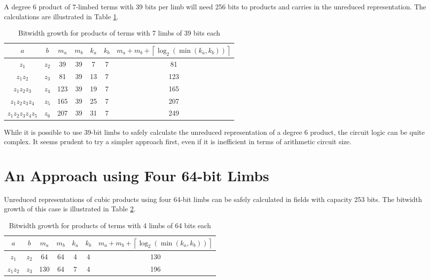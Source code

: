 \documentclass[a4paper, 12pt]{article}
\begin{document}
A degree 6 product of 7-limbed terms with 39 bits per limb will need 256 bits to products and carries in the unreduced representation. The calculations are illustrated in Table \ref{tab:limb39}.
\begin{table}[h]
  \centering
  \begin{tabular}{c|c|c|c|c|c|c}
    $a$ & $b$ & $m_a$ & $m_b$ & $k_a$ & $k_b$ & $m_a+m_b+\left\lceil \log_2 \left( \min\left( k_a, k_b \right) \right) \right\rceil$ \\ \hline
    $z_1$ & $z_2$ & 39 & 39 & 7 & 7 & 81 \\ \hline
    $z_1z_2$ & $z_3$ & 81 & 39 & 13 & 7 & 123 \\ \hline
    $z_1z_2z_3$ & $z_4$ & 123 & 39 & 19 & 7 & 165 \\ \hline
    $z_1z_2z_3z_4$ & $z_5$ & 165 & 39 & 25 & 7 & 207 \\ \hline
    $z_1z_2z_3z_4z_5$ & $z_6$ & 207 & 39 & 31 & 7 & 249 \\ \hline
  \end{tabular}
  \caption{Bitwidth growth for products of terms with 7 limbs of 39 bits each}
  \label{tab:limb39}
\end{table}

While it is possible to use 39-bit limbs to safely calculate the unreduced representation of a degree 6 product, the circuit logic can be quite complex. It seems prudent to try a simpler approach first, even if it is inefficient in terms of arithmetic circuit size.

\newpage
\section{An Approach using Four 64-bit Limbs}%
\label{sec:an_approach_using_four_64_bit_limbs}
Unreduced representations of cubic products using four 64-bit limbs can be safely calculated in fields with capacity 253 bits. The bitwidth growth of this case is illustrated in Table \ref{tab:limb64}.
\begin{table}[h]
  \centering
  \begin{tabular}{c|c|c|c|c|c|c}
    $a$ & $b$ & $m_a$ & $m_b$ & $k_a$ & $k_b$ & $m_a+m_b+\left\lceil \log_2 \left( \min\left( k_a, k_b \right) \right) \right\rceil$ \\ \hline
    $z_1$ & $z_2$ & 64 & 64 & 4 & 4 & 130 \\ \hline
    $z_1z_2$ & $z_3$ & 130 & 64 & 7 & 4 & 196 \\ \hline
  \end{tabular}
  \caption{Bitwidth growth for products of terms with 4 limbs of 64 bits each}
  \label{tab:limb64}
\end{table}
\end{document}
